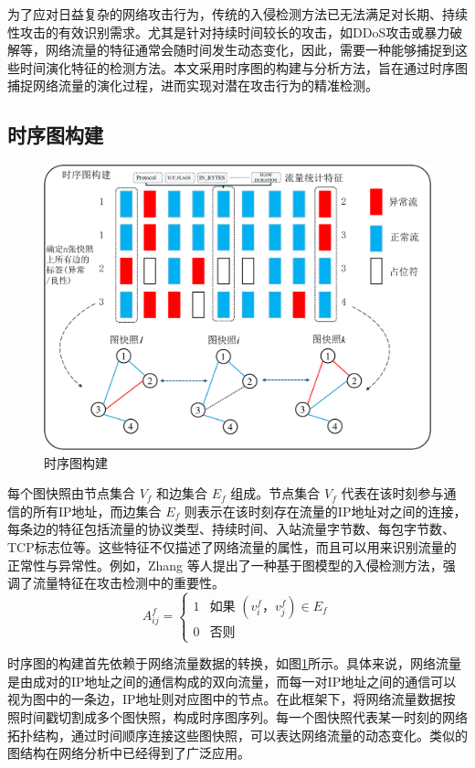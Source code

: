 \documentclass[promaster]{thesis-uestc}
\begin{document}
为了应对日益复杂的网络攻击行为，传统的入侵检测方法已无法满足对长期、持续性攻击的有效识别需求。尤其是针对持续时间较长的攻击，如DDoS攻击或暴力破解等，网络流量的特征通常会随时间发生动态变化，因此，需要一种能够捕捉到这些时间演化特征的检测方法。本文采用时序图的构建与分析方法，旨在通过时序图捕捉网络流量的演化过程，进而实现对潜在攻击行为的精准检测。
\subsection{时序图构建}
\begin{figure}[h!]
    \centering
    \includegraphics[width=1\linewidth]{./pic/SpatiotemporalGraph(大字版).pdf}
    \caption{时序图构建}
    \label{SpationtemporalGraph}
\end{figure}

每个图快照由节点集合 \( V_f \) 和边集合 \( E_f \) 组成。节点集合 \( V_f \) 代表在该时刻参与通信的所有IP地址，而边集合 \( E_f \) 则表示在该时刻存在流量的IP地址对之间的连接，每条边的特征包括流量的协议类型、持续时间、入站流量字节数、每包字节数、TCP标志位等。这些特征不仅描述了网络流量的属性，而且可以用来识别流量的正常性与异常性。例如，Zhang 等人提出了一种基于图模型的入侵检测方法，强调了流量特征在攻击检测中的重要性。
\begin{equation}
A_{ij}^f = \begin{cases} 
1 & \text{如果 } (v_i^f， v_j^f) \in E_f \\
0 & \text{否则}
\label{a_ij}
\end{cases}
\end{equation}

时序图的构建首先依赖于网络流量数据的转换，如图\ref{SpationtemporalGraph}所示。具体来说，网络流量是由成对的IP地址之间的通信构成的双向流量，而每一对IP地址之间的通信可以视为图中的一条边，IP地址则对应图中的节点。在此框架下，将网络流量数据按照时间戳切割成多个图快照，构成时序图序列。每一个图快照代表某一时刻的网络拓扑结构，通过时间顺序连接这些图快照，可以表达网络流量的动态变化。类似的图结构在网络分析中已经得到了广泛应用。
\end{document}
